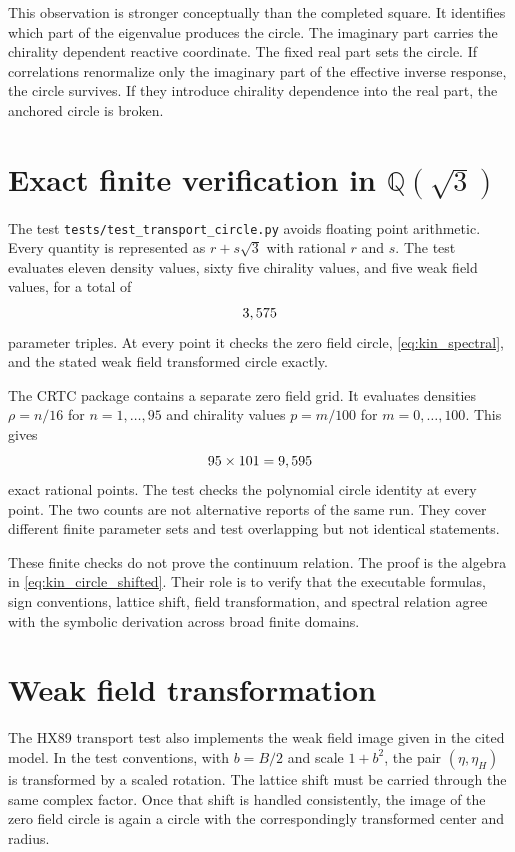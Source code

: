 This observation is stronger conceptually than the completed square. It identifies which part of the eigenvalue produces the circle. The imaginary part carries the chirality dependent reactive coordinate. The fixed real part sets the circle. If correlations renormalize only the imaginary part of the effective inverse response, the circle survives. If they introduce chirality dependence into the real part, the anchored circle is broken.

\section{Exact finite verification in $\mathbb{Q}(\sqrt3)$}
The test \texttt{tests/test\_transport\_circle.py} avoids floating point arithmetic. Every quantity is represented as $r+s\sqrt3$ with rational $r$ and $s$. The test evaluates eleven density values, sixty five chirality values, and five weak field values, for a total of
\begin{equation}
 3,575{}
 \label{eq:transport_grid_count}
\end{equation}
parameter triples. At every point it checks the zero field circle, \cref{eq:kin_spectral}, and the stated weak field transformed circle exactly.

The CRTC package contains a separate zero field grid. It evaluates densities $\rho=n/16$ for $n=1,\ldots,95$ and chirality values $p=m/100$ for $m=0,\ldots,100$. This gives
\begin{equation}
 95\times101=9,595{}
 \label{eq:crtc_boltz_grid_count}
\end{equation}
exact rational points. The test checks the polynomial circle identity at every point. The two counts are not alternative reports of the same run. They cover different finite parameter sets and test overlapping but not identical statements.

These finite checks do not prove the continuum relation. The proof is the algebra in \cref{eq:kin_circle_shifted}. Their role is to verify that the executable formulas, sign conventions, lattice shift, field transformation, and spectral relation agree with the symbolic derivation across broad finite domains.

\section{Weak field transformation}
The HX89 transport test also implements the weak field image given in the cited model. In the test conventions, with $b=B/2$ and scale $1+b^2$, the pair $(\eta,\eta_H)$ is transformed by a scaled rotation. The lattice shift must be carried through the same complex factor. Once that shift is handled consistently, the image of the zero field circle is again a circle with the correspondingly transformed center and radius.

